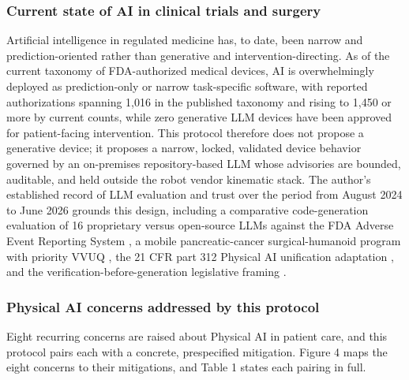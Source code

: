 \subsubsection*{Current state of AI in clinical trials and surgery}

Artificial intelligence in regulated medicine has, to date, been narrow and
prediction-oriented rather than generative and intervention-directing. As of the
current taxonomy of FDA-authorized medical devices, AI is overwhelmingly deployed
as prediction-only or narrow task-specific software, with reported authorizations
spanning 1,016 in the published taxonomy \cite{Singh2025} and rising to 1,450 or
more by current counts, while zero generative LLM devices have been approved for
patient-facing intervention. This protocol therefore does not propose a generative
device; it proposes a narrow, locked, validated device behavior governed by an
on-premises repository-based LLM whose advisories are bounded, auditable, and
held outside the robot vendor kinematic stack. The author's established record of
LLM evaluation and trust over the period from August 2024 to June 2026 grounds
this design, including a comparative code-generation evaluation of 16 proprietary
versus open-source LLMs against the FDA Adverse Event Reporting System
\cite{kawchak2025codegen16}, a mobile pancreatic-cancer surgical-humanoid program
with priority VVUQ \cite{kawchak2026unitree}, the 21 CFR part 312 Physical AI
unification adaptation \cite{kawchak2026adapt312}, and the
verification-before-generation legislative framing \cite{kawchak2026hr9510}.

\subsubsection*{Physical AI concerns addressed by this protocol}

Eight recurring concerns are raised about Physical AI in patient care, and this
protocol pairs each with a concrete, prespecified mitigation. Figure 4 maps the
eight concerns to their mitigations, and Table 1 states each pairing in full.

